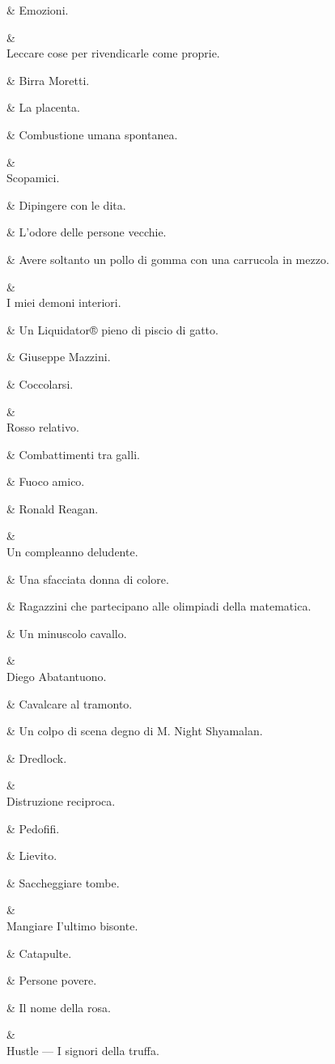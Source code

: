&
Emozioni.

&
\\
Leccare cose
per rivendicarle
come proprie.

&
Birra Moretti.

&
La placenta.

&
Combustione
umana
spontanea.

&
\\
Scopamici.

&
Dipingere con le
dita.

&
L’odore delle
persone vecchie.

&
Avere soltanto
un pollo di
gomma con una
carrucola in
mezzo.

&
\\
I miei demoni
interiori.

&
Un Liquidator®
pieno di piscio di
gatto.

&
Giuseppe
Mazzini.

&
Coccolarsi.

&
\\
Rosso relativo.

&
Combattimenti
tra galli.

&
Fuoco amico.

&
Ronald Reagan.

&
\\
Un compleanno
deludente.

&
Una sfacciata
donna di colore.

&
Ragazzini che
partecipano alle
olimpiadi della
matematica.

&
Un minuscolo
cavallo.

&
\\
Diego
Abatantuono.

&
Cavalcare al
tramonto.

&
Un colpo di
scena degno
di M. Night
Shyamalan.

&
Dredlock.

&
\\
Distruzione
reciproca.

&
Pedoﬁﬁ.

&
Lievito.

&
Saccheggiare
tombe.

&
\\
Mangiare I’ultimo
bisonte.

&
Catapulte.

&
Persone povere.

&
Il nome della
rosa.

&
\\
Hustle — I signori
della truffa.


